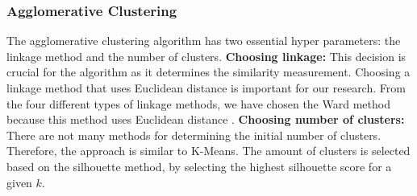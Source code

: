 \subsubsection{Agglomerative Clustering} \label{theory:clustering-agglomerative}
The agglomerative clustering algorithm has two essential hyper parameters: the linkage method and the number of clusters. \newline
\textbf{Choosing linkage:}
This decision is crucial for the algorithm as it determines the similarity measurement.
Choosing a linkage method that uses Euclidean distance is important for our research.
From the four different types of linkage methods, we have chosen the Ward method because this method uses Euclidean distance \citep{roux_comparative_2015,seetharaman_brief_2019}. \newline
\textbf{Choosing number of clusters:}
There are not many methods for determining the initial number of clusters.
Therefore, the approach is similar to K-Means.
The amount of clusters is selected based on the silhouette method, by selecting the highest silhouette score for a given $k$.

